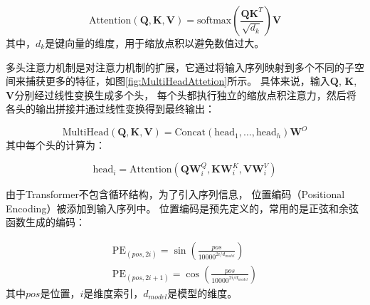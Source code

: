 \begin{equation}
    \text{Attention}(\mathbf{Q}, \mathbf{K}, \mathbf{V}) = \text{softmax}\left(\frac{\mathbf{QK}^T}{\sqrt{d_k}}\right)\mathbf{V}
\end{equation}
其中，$d_k$是键向量的维度，用于缩放点积以避免数值过大。

多头注意力机制是对注意力机制的扩展，它通过将输入序列映射到多个不同的子空间来捕获更多的特征，如图\ref{fig:MultiHeadAttetion}所示。
具体来说，输入$\mathbf{Q}$, $\mathbf{K}$, $\mathbf{V}$分别经过线性变换生成多个头，
每个头都执行独立的缩放点积注意力，然后将各头的输出拼接并通过线性变换得到最终输出：

\begin{equation}
    \text{MultiHead}(\mathbf{Q}, \mathbf{K}, \mathbf{V}) = \text{Concat}(\text{head}_1, \ldots, \text{head}_h)\mathbf{W}^O
\end{equation}
其中每个头的计算为：

\begin{equation}
    \text{head}_i = \text{Attention}(\mathbf{Q}\mathbf{W}_i^Q, \mathbf{K}\mathbf{W}_i^K, \mathbf{V}\mathbf{W}_i^V)
\end{equation}

由于Transformer不包含循环结构，为了引入序列信息，
位置编码（Positional Encoding）被添加到输入序列中。
位置编码是预先定义的，常用的是正弦和余弦函数生成的编码：

\begin{equation}
    \begin{aligned}
        \text{PE}_{(pos, 2i)} = \sin\left(\frac{pos}{10000^{2i/d_{model}}}\right)\\
        \text{PE}_{(pos, 2i+1)} = \cos\left(\frac{pos}{10000^{2i/d_{model}}}\right)
    \end{aligned}
\end{equation}
其中$pos$是位置，$i$是维度索引，$d_{model}$是模型的维度。

